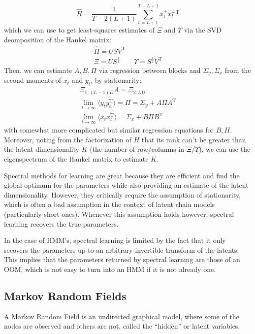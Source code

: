 \documentclass[a4paper]{article}
\begin{document}
\[ \hat{H} = \frac{1}{T-2(L+1)} \sum_{t=L+1}^{T-L+1} x_t^+{x_t^-}^\textrm{T} \]
 which we can use to get least-squares estimates of $\Xi$ and $\Upsilon$ via the SVD deomposition of the Hankel matrix:
\begin{gather*}
\hat{H} = USV^\textrm{T} \\
\Xi = US^{\frac{1}{2}} \quad\quad \Upsilon = S^{\frac{1}{2}}V^\textrm{T}
\end{gather*}
Then, we can estimate $A,B,\Pi$ via regression between blocks and $\Sigma_y,\Sigma_x$ from the second moments of $x_t$ and $y_t$, by stationarity:
\begin{gather*}
\Xi_{1:(L-1)D}A = \Xi_{2:LD} \\
\underset{t\rightarrow \infty}{\lim} \langle y_ty_t^\textrm{T} \rangle = \Pi = \Sigma_y + A\Pi A^\textrm{T} \\
\underset{t\rightarrow \infty}{\lim} \langle x_tx_t^\textrm{T} \rangle = \Sigma_x + B\Pi B^\textrm{T}
\end{gather*}
with somewhat more complicated but similar regression equations for $B,\Pi$. Moreover, noting from the factorization of $H$ that its rank can't be greater than the latent dimensionality $K$ (the number of row/columns in $\Xi$/$\Upsilon$), we can use the eigenspectrum of the Hankel matrix to estimate $K$.

Spectral methods for learning are great because they are efficient and find the global optimum for the parameters while also providing an estimate of the latent dimensionality. However, they critically require the assumption of stationarity, which is often a bad assumption in the context of latent chain models (particularly short ones). Whenever this assumption holds however, spectral learning recovers the true parameters.

In the case of HMM's, spectral learning is limited by the fact that it only recovers the parameters up to an arbitrary invertible transform of the latents. This implies that the parameters returned by spectral learning are those of an OOM, which is not easy to turn into an HMM if it is not already one. 

\subsection{Markov Random Fields} \label{mrfs}
A Markov Random Field is an undirected graphical model, where some of the nodes are observed and others are not, called the ``hidden'' or latent variables. 
\end{document}
